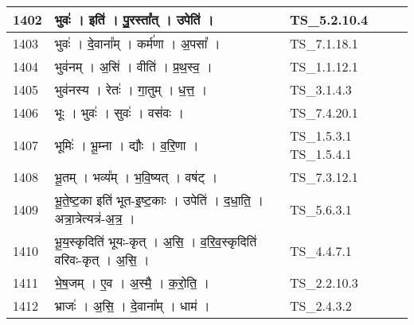 \documentclass[17pt]{extarticle}
\begin{document}
\begin{longtable}{||p{0.4in}||p{4.9in}||p{0.9in}||}
    \hline
        
    1402 & भुवः॑   ।   इति॑   ।   पु॒रस्ता᳚त्   ।   उपेति॑   ।    & TS\_5.2.10.4       \\
    
    \hline
        
    1403 & भुवः॑   ।   दे॒वाना᳚म्   ।   कर्म॑णा   ।   अ॒पसा᳚   ।    & TS\_7.1.18.1       \\
    
    \hline
        
    1404 & भुव॑नम्   ।   अ॒सि॑   ।   वीति॑   ।   प्र॒थ॒स्व॒   ।    & TS\_1.1.12.1       \\
    
    \hline
        
    1405 & भुव॑नस्य   ।   रेतः॑   ।   गा॒तुम्   ।   ध॒त्त॒   ।    & TS\_3.1.4.3       \\
    
    \hline
        
    1406 & भूः   ।   भुवः॑   ।   सुवः॑   ।   वस॑वः   ।    & TS\_7.4.20.1       \\
    
    \hline
        
    1407 & भूमिः॑   ।   भू॒म्ना   ।   द्यौः   ।   व॒रि॒णा   ।    & TS\_1.5.3.1 TS\_1.5.4.1       \\
    
    \hline
        
    1408 & भू॒तम्   ।   भव्य᳚म्   ।   भ॒वि॒ष्यत्   ।   वष॑ट्   ।    & TS\_7.3.12.1       \\
    
    \hline
        
    1409 & भू॒ते॒ष्ट॒का इति॑ भूत{-}इ॒ष्ट॒काः   ।   उपेति॑   ।   द॒धा॒ति॒   ।   अत्रा॒त्रेत्यत्र॑{-}अ॒त्र॒   ।    & TS\_5.6.3.1       \\
    
    \hline
        
    1410 & भू॒य॒स्कृदिति॑ भूयः{-}कृत्   ।   अ॒सि॒   ।   व॒रि॒व॒स्कृदिति॑ वरिवः{-}कृत्   ।   अ॒सि॒   ।    & TS\_4.4.7.1       \\
    
    \hline
        
    1411 & भे॒ष॒जम्   ।   ए॒व   ।   अ॒स्मै॒   ।   क॒रो॒ति॒   ।    & TS\_2.2.10.3       \\
    
    \hline
        
    1412 & भ्राजः॑   ।   अ॒सि॒   ।   दे॒वाना᳚म्   ।   धाम॑   ।    & TS\_2.4.3.2       \\
    

\end{longtable}
\end{document}
